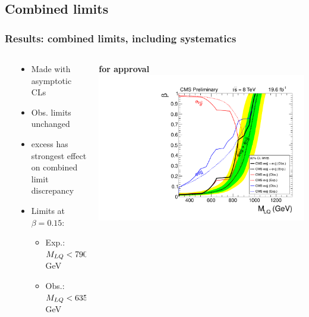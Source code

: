 \documentclass[bigger]{beamer}
\providecommand{\alert}[1]{\textbf{#1}}
\begin{document}
\subsection{Combined limits}
\label{sec-5-2}
\begin{frame}
\frametitle{Results: combined limits, including systematics}
\label{sec-5-2-1}
\begin{columns} %
\label{sec-5-2-1-1}
\begin{column}{0.5\textwidth}
\label{sec-5-2-1-1-1}

\begin{itemize}
\item Made with asymptotic CLs
\item Obs. limits unchanged
\item \enujj excess has strongest effect on combined limit discrepancy
\item Limits at $\beta = 0.15$:
\begin{itemize}
\item Exp.: $M_{LQ} < 790$ GeV
\item Obs.: $M_{LQ} < 635$ GeV
\end{itemize}
\end{itemize}
\end{column}
\begin{column}{0.5\textwidth}
\label{sec-5-2-1-1-2}

\centering
\alert{for approval}
\includegraphics[width=\textwidth]{fig/limits/LQ1Combination.pdf}
\end{column}
\end{columns}
\end{frame}
\end{document}
